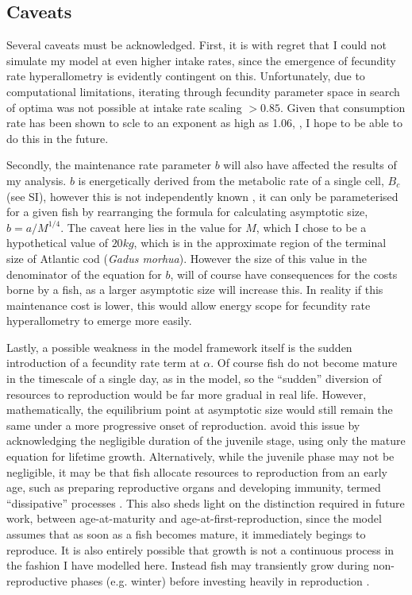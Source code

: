 \documentclass[a4paper]{article} %
\begin{document}
\subsection{Caveats}
Several caveats must be acknowledged. First, it is with regret that I could not simulate my model at even higher intake rates, since the emergence of fecundity rate hyperallometry is evidently contingent on this. Unfortunately, due to computational limitations, iterating through fecundity parameter space in search of optima was not possible at intake rate scaling $> 0.85$. Given that consumption rate has been shown to scle to an exponent as high as 1.06, \autocite{Pawar2012}, I hope to be able to do this in the future.

Secondly, the maintenance rate parameter $b$ will also have affected the results of my analysis. $b$ is energetically derived from the metabolic rate of a single cell, $B_c$ (see SI), however this is not independently known \autocite{West2001}, it can only be parameterised for a given fish by rearranging the formula for calculating asymptotic size,  $b = a/M^{1/4}$. The caveat here lies in the value for $M$, which I chose to be a hypothetical value of $20kg$, which is in the approximate region of the terminal size of Atlantic cod (\textit{Gadus morhua}). However the size of this value in the denominator of the equation for $b$, will of course have consequences for the costs borne by a fish, as a larger asymptotic size will increase this. In reality if this maintenance cost is lower, this would allow energy scope for fecundity rate hyperallometry to emerge more easily.

Lastly, a possible weakness in the model framework itself is the sudden introduction of a fecundity rate term at $\alpha$. Of course fish do not become mature in the timescale of a single day, as in the model, so the ``sudden'' diversion of resources to reproduction would be far more gradual in real life. However, mathematically, the equilibrium point at asymptotic size would still remain the same under a more progressive onset of reproduction. \textcite{West2001} avoid this issue by acknowledging the negligible duration of the juvenile stage, using only the mature equation for lifetime growth. Alternatively, while the juvenile phase may not be negligible, it may be that fish allocate resources to reproduction from an early age, such as preparing reproductive organs and developing immunity, termed ``dissipative'' processes \autocite{kooijman2010dynamic, Kearney2012a}. This also sheds light on the distinction required in future work, between age-at-maturity and age-at-first-reproduction, since the model assumes that as soon as a fish becomes mature, it immediately begings to reproduce. It is also entirely possible that growth is not a continuous process in the fashion I have modelled here. Instead fish may transiently grow during non-reproductive phases (e.g. winter) before investing heavily in reproduction \autocite{Kozowski1987-indeterminate}.
\end{document}
